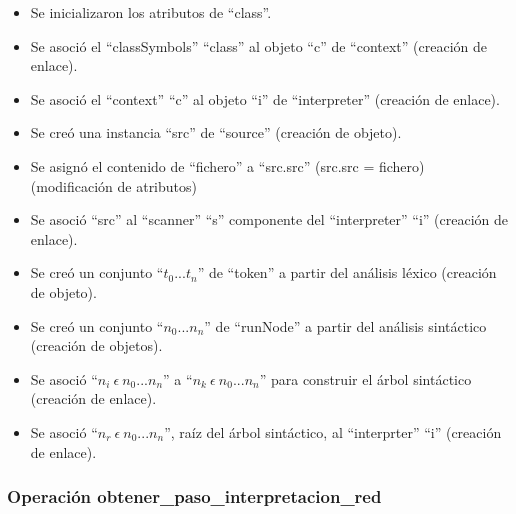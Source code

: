 \begin{description}
\begin {itemize}
         \item Se inicializaron los atributos de ``class''.
         \item Se asoció el ``classSymbols'' ``class'' al objeto ``c'' de ``context'' (creación de enlace).
         \item Se asoció el ``context'' ``c'' al objeto ``i'' de ``interpreter'' (creación de enlace).
         \item Se creó una instancia ``src'' de ``source'' (creación de objeto).
         \item Se asignó el contenido de ``fichero'' a ``src.src'' (src.src = fichero) (modificación de atributos)
         \item Se asoció ``src'' al ``scanner'' ``s'' componente del ``interpreter'' ``i'' (creación de enlace). 
         \item Se creó un conjunto ``$t_0...t_n$'' de ``token'' a partir del análisis léxico (creación de objeto).
         \item Se creó un conjunto ``$n_0...n_n$'' de ``runNode'' a partir del análisis sintáctico (creación de objetos).
         \item Se asoció ``$n_i\ \epsilon\ n_0...n_n$'' a ``$n_k\ \epsilon\ n_0...n_n$'' para construir el árbol sintáctico (creación de enlace).
         \item Se asoció  ``$n_r\ \epsilon\ n_0...n_n$'', raíz del árbol sintáctico, al ``interprter'' ``i'' (creación de enlace).
      \end{itemize}
	\end{description}


\subsubsection{Operación obtener\_paso\_interpretacion\_red}


